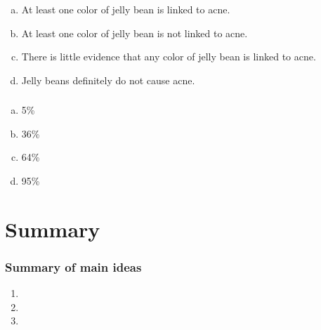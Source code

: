 \documentclass[11pt,containsverbatim,handout,xcolor=xelatex,dvipsnames,table]{beamer}
\newcommand{\solnMult}[1]{#1}
\begin{document}

\begin{frame}
\frametitle{}


\begin{enumerate}[(a)]
\item At least one color of jelly bean is linked to acne.
\item At least one color of jelly bean is not linked to acne.
\item \solnMult{There is little evidence that any color of jelly bean is linked to acne.}
\item Jelly beans definitely do not cause acne.
\end{enumerate}

\end{frame}


\begin{frame}
\frametitle{}


\begin{enumerate}[(a)]
\item \solnMult{5\%}
\item 36\%
\item 64\%
\item 95\%
\end{enumerate}

\end{frame}


\begin{frame}

\vfill


\vfill

\end{frame}


\section{Summary}


\begin{frame}
\frametitle{Summary of main ideas}

\vfill

\begin{enumerate}

\item {}

\item {}

\item {}

\end{enumerate}

\vfill

\end{frame}

\end{document}
